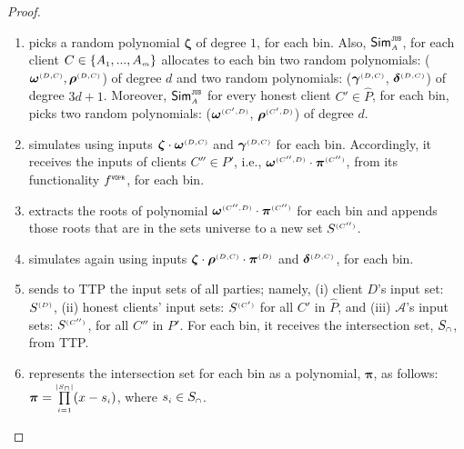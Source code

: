 \begin{proof}
\begin{enumerate}
%
\item picks a random polynomial ${\bm\zeta}$ of degree $1$, for each bin. Also, $\mathsf{Sim}^{\scriptscriptstyle \mathtt{JUS}}_{\scriptscriptstyle A}$, for each client $  {  C}\in \{  {  A}_{ \scriptscriptstyle {   1}}, ...,   {  A}_{ \scriptscriptstyle {   m}}\}$ allocates to each bin two random polynomials: (${\bm\omega}^{ \scriptscriptstyle {  {(D,C)}}}, {\bm\rho}^{ \scriptscriptstyle {  {(D,C)}}}$) of degree $d$ and   two random polynomials: (${\bm\gamma}^{ \scriptscriptstyle {  {(D,C)}}}$, ${\bm\delta}^{ \scriptscriptstyle {  {(D,C)}}}$) of degree $3d+1$. Moreover, $\mathsf{Sim}^{\scriptscriptstyle \mathtt{JUS}}_{\scriptscriptstyle A}$ for every honest client $C'\in \hat P$, for each bin, picks two random polynomials: (${\bm\omega}^{ \scriptscriptstyle {  {(C',D)}}}$, ${\bm\rho}^{ \scriptscriptstyle {  {(C',D)}}}$) of degree $d$. %
%
\item\label{F-PSI::sim-A-first-VOPR-invocation} simulates \vopr using inputs ${\bm\zeta} \cdot {\bm\omega}^{ \scriptscriptstyle {  {(D,C)}}}$ and ${\bm\gamma}^{ \scriptscriptstyle {  {(D,C)}}}$ for each bin. Accordingly, it receives the inputs of clients $C''\in P'$, i.e., ${\bm\omega}^{ \scriptscriptstyle {  {(C'',D)}}}\cdot {\bm\pi}^{ \scriptscriptstyle {  {(C'')}}}$, from its functionality $f^{\scriptscriptstyle \mathtt{VOPR}}$, for each bin.  
%
%
\item extracts the roots of polynomial ${\bm\omega}^{ \scriptscriptstyle {  {(C'',D)}}}\cdot {\bm\pi}^{ \scriptscriptstyle {  {(C'')}}}$ for each bin and appends those roots that are in the sets universe to a new set $S^{\scriptscriptstyle(C'')}$. 
%
\item simulates  \vopr again using inputs ${\bm\zeta}\cdot {\bm \rho}^{ \scriptscriptstyle {  {(D,C)}}}\cdot {\bm\pi}^{ \scriptscriptstyle {  {(D)}}}$ and ${\bm\delta}^{ \scriptscriptstyle {  {(D,C)}}}$, for each bin. %
%
\item sends to TTP the input sets of all parties; namely, (i) client $D$'s input set: $S^{\scriptscriptstyle (D)}$, (ii) honest clients' input sets: $S^{\scriptscriptstyle (C')}$ for all $C'$ in $\hat P$, and (iii) $\mathcal{A}$'s input sets: $S^{\scriptscriptstyle(C'')}$, for all $C''$ in $P'$.  For each bin, it receives the intersection set, $S_{\scriptscriptstyle\cap}$, from TTP. 
%
\item represents the intersection set for each bin as a polynomial, ${\bm \pi}$, as follows: ${\bm \pi}=\prod\limits^{\scriptscriptstyle |S_{\scriptscriptstyle\cap}|}_{\scriptscriptstyle i=1 }(x-s_{\scriptscriptstyle i})$, where $s_{\scriptscriptstyle i}\in S_{\scriptscriptstyle\cap}$. 


\end{enumerate}
\end{proof}
